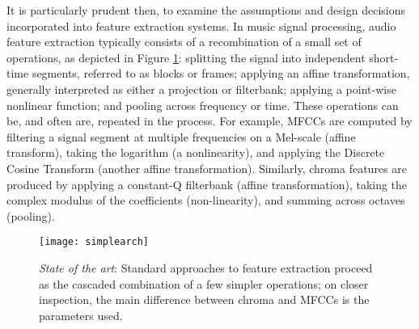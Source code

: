 It is particularly prudent then, to examine the assumptions and design decisions incorporated into feature extraction systems.
In music signal processing, audio feature extraction typically consists of a recombination of a small set of operations, as depicted in Figure \ref{fig:simplearch}: splitting the signal into independent short-time segments, referred to as blocks or frames; applying an affine transformation, generally interpreted as either a projection or filterbank; applying a point-wise nonlinear function; and pooling across frequency or time.
These operations can be, and often are, repeated in the process.
For example, MFCCs are computed by filtering a signal segment at multiple frequencies on a Mel-scale (affine transform), taking the logarithm (a nonlinearity), and applying the Discrete Cosine Transform (another affine transformation).
Similarly, chroma features are produced by applying a constant-Q filterbank (affine transformation), taking the complex modulus of the coefficients (non-linearity), and summing across octaves (pooling).

\begin{figure}[t]
\begin{centering}
\texttt{[image: simplearch]}
\caption{\emph{State of the art}: Standard approaches to feature extraction proceed as the cascaded combination of a few simpler operations; on closer inspection, the main difference between chroma and MFCCs is the parameters used.}
\label{fig:simplearch}
\end{centering}
\end{figure}


